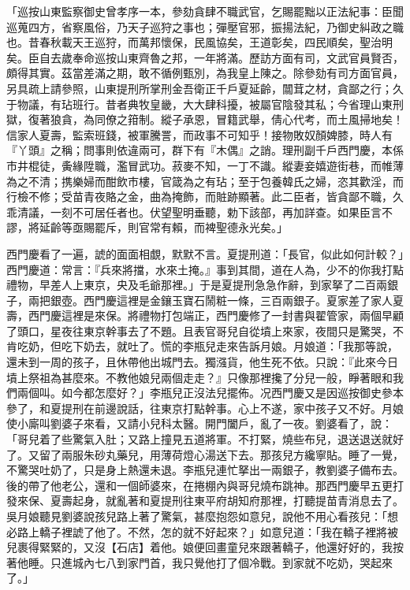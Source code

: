 \begin{showcontents}{}
「巡按山東監察御史曾孝序一本，參劾貪肆不職武官，乞賜罷黜以正法紀事：臣聞巡蒐四方，省察風俗，乃天子巡狩之事也；彈壓官邪，振揚法紀，乃御史糾政之職也。昔春秋載天王巡狩，而萬邦懷保，民風協矣，王道彰矣，四民順矣，聖治明矣。臣自去歲奉命巡按山東齊魯之邦，一年將滿。歷訪方面有司，文武官員賢否，頗得其實。茲當差滿之期，敢不循例甄別，為我皇上陳之。除參劾有司方面官員，另具疏上請參照，山東提刑所掌刑金吾衛正千戶夏延齡，闒茸之材，貪鄙之行；久于物議，有玷班行。昔者典牧皇畿，大大肆科擾，被屬官陰發其私；今省理山東刑獄，復著狼貪，為同僚之箝制。縱子承恩，冒籍武舉，倩心代考，而土風掃地矣！信家人夏壽，監索班錢，被軍騰詈，而政事不可知乎！接物敗奴顏婢膝，時人有『丫頭』之稱；問事則依違兩可，群下有『木偶』之誚。理刑副千戶西門慶，本係市井棍徒，夤緣陞職，濫冒武功。菽麥不知，一丁不識。縱妻妾嬉遊街巷，而帷薄為之不清；携樂婦而酣飲市樓，官箴為之有玷；至于包養韓氏之婦，恣其歡淫，而行檢不修；受苗青夜賂之金，曲為掩飾，而賍跡顯著。此二臣者，皆貪鄙不職，久乖清議，一刻不可居任者也。伏望聖明垂聽，勅下該部，再加詳查。如果臣言不謬，將延齡等亟賜罷斥，則官常有賴，而裨聖德永光矣。」

西門慶看了一遍，諕的面面相覷，默默不言。夏提刑道：「長官，似此如何計較？」西門慶道：常言：『兵來將擋，水來土掩。』事到其間，道在人為，少不的你我打點禮物，早差人上東京，央及毛爺那裡。」于是夏提刑急急作辭，到家拏了二百兩銀子，兩把銀壺。西門慶這裡是金鑲玉寶石鬧粧一條，三百兩銀子。夏家差了家人夏壽，西門慶這裡是來保。將禮物打包端正，西門慶修了一封書與翟管家，兩個早顧了頭口，星夜往東京幹事去了不題。且表官哥兒自從墳上來家，夜間只是驚哭，不肯吃奶，但吃下奶去，就吐了。慌的李瓶兒走來告訴月娘。月娘道：「我那等說，還未到一周的孩子，且休帶他出城門去。獨漒貨，他生死不依。只說：『此來今日墳上祭祖為甚麼來。不教他娘兒兩個走走？』只像那裡攙了分兒一般，睜著眼和我們兩個叫。如今都怎麼好？」李瓶兒正沒法兒擺佈。况西門慶又是因巡按御史參本參了，和夏提刑在前邊說話，往東京打點幹事。心上不遂，家中孩子又不好。月娘使小廝叫劉婆子來看，又請小兒科太醫。開門闔戶，亂了一夜。劉婆看了，說：「哥兒着了些驚氣入肚；又路上撞見五道將軍。不打緊，燒些布兒，退送退送就好了。又留了兩服朱砂丸藥兒，用薄荷燈心湯送下去。那孩兒方纔寧貼。睡了一覺，不驚哭吐奶了，只是身上熱還未退。李瓶兒連忙拏出一兩銀子，教劉婆子備布去。後的帶了他老公，還和一個師婆來，在捲棚內與哥兒燒布跳神。那西門慶早五更打發來保、夏壽起身，就亂著和夏提刑往東平府胡知府那裡，打聽提苗青消息去了。吳月娘聽見劉婆說孩兒路上著了驚氣，甚麼抱怨如意兒，說他不用心看孩兒：「想必路上轎子裡諕了他了。不然，怎的就不好起來？」如意兒道：「我在轎子裡將被兒裹得緊緊的，又沒【石店】着他。娘便回畫童兒來跟著轎子，他還好好的，我按著他睡。只進城內七八到家門首，我只覺他打了個冷戰。到家就不吃奶，哭起來了。」


\end{showcontents}
